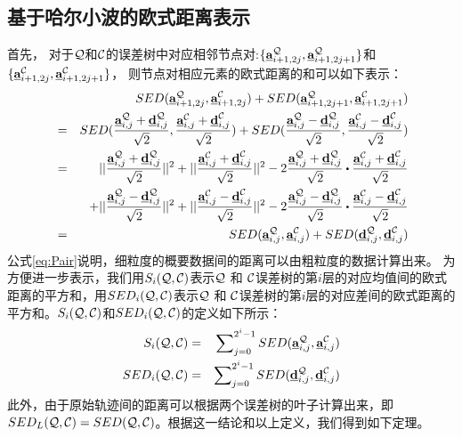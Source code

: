 \subsection{基于哈尔小波的欧式距离表示}
首先， 对于$\cal Q$和$\cal C$的误差树中对应相邻节点对:$\{\emph{{\textbf{a}}}_{i+1,2j}^{\cal Q}, \emph{{\textbf{a}}}_{i+1,2j+1}^{\cal Q}\}$和$\{\emph{{\textbf{a}}}_{i+1,2j}^{\cal C}, \emph{{\textbf{a}}}_{i+1,2j+1}^{\cal C} \}$，
 则节点对相应元素的欧式距离的和可以如下表示：
  \allowdisplaybreaks
 \begin{eqnarray}\label{eq:Pair}
&& SED(\va_{i+1,2j}^{\cal Q},\va_{i+1,2j}^{\cal C}) + SED(\va_{i+1,2j+1}^{\cal Q},\va_{i+1,2j+1}^{\cal C}) \\ \nonumber
&=& SED(\frac{\va_{i,j}^{\cal Q} + \vd_{i,j}^{\cal Q}}{\sqrt{2}}, \frac{\va_{i,j}^{\cal C}+ \vd_{i,j}^{\cal C}}{\sqrt{2}}) + 
SED(\frac{\va_{i,j}^{\cal Q} - \vd_{i,j}^{\cal Q}}{\sqrt{2}}, \frac{\va_{i,j}^{\cal C} - \vd_{i,j}^{\cal C}}{\sqrt{2}}) \\ \nonumber 
&=& ||\frac{\va_{i,j}^{\cal Q}+ \vd_{i,j}^{\cal Q}}{\sqrt{2}}||^2 + ||\frac{\va_{i,j}^{\cal C}+ \vd_{i,j}^{\cal C}}{\sqrt{2}}||^2 
-2 \frac{\va_{i,j}^{\cal Q}+ \vd_{i,j}^{\cal Q}}{\sqrt{2}} \bigcdot \frac{\va_{i,j}^{\cal C}+ \vd_{i,j}^{\cal C}}{\sqrt{2}}
\\ \nonumber
&&+ ||\frac{\va_{i,j}^{\cal Q} - \vd_{i,j}^{\cal Q}}{\sqrt{2}}||^2 + ||\frac{\va_{i,j}^{\cal C} - \vd_{i,j}^{\cal C}}{\sqrt{2}}||^2  -2 \frac{\va_{i,j}^{\cal Q} - \vd_{i,j}^{\cal Q}}{\sqrt{2}} \bigcdot \frac{\va_{i,j}^{\cal C} - \vd_{i,j}^{\cal C}}{\sqrt{2}}\\ \nonumber
&=& SED(\va_{i,j}^{\cal Q}, \va_{i,j}^{\cal C}) + SED(\vd_{i,j}^{\cal Q}, \vd_{i,j}^{\cal C})
 \end{eqnarray}
 \allowdisplaybreaks[4]
公式\ref{eq:Pair}说明，细粒度的概要数据间的距离可以由粗粒度的数据计算出来。
为方便进一步表示，我们用$S_{i}(\cal Q, \cal C)$表示${\cal Q}$ 和 ${\cal C}$误差树的第$i$层的对应均值间的欧式距离的平方和，用$SED_{i}(\cal Q, \cal C)$表示${\cal Q}$ 和 ${\cal C}$误差树的第$i$层的对应差间的欧式距离的平方和。$S_{i}(\cal Q, \cal C)$和$SED_{i}(\cal Q, \cal C)$的定义如下所示：
\begin{eqnarray}\label{eq:basic}
S_{i}({\cal Q}, {\cal C})& = & \sum\nolimits_{j=0}^{2^{i}-1}SED( \emph{{\textbf{a}}}_{i,j}^{\cal Q}, \emph{{\textbf{a}}}_{i,j}^{\cal C})\label{eq:defSI}  \\
SED_{i}({\cal Q}, {\cal C}) & = & \sum\nolimits_{j=0}^{2^{i}-1}SED(\emph{{\textbf{d}}}_{i,j}^{\cal Q}, \emph{{\textbf{d}}}_{i,j}^{\cal C})   \label{eq:defSEDI}
\end{eqnarray}
此外，由于原始轨迹间的距离可以根据两个误差树的叶子计算出来，即$SED_{L}{(\cal Q, \cal C)} = SED(\cal Q, \cal C)$。根据这一结论和以上定义，我们得到如下定理。
